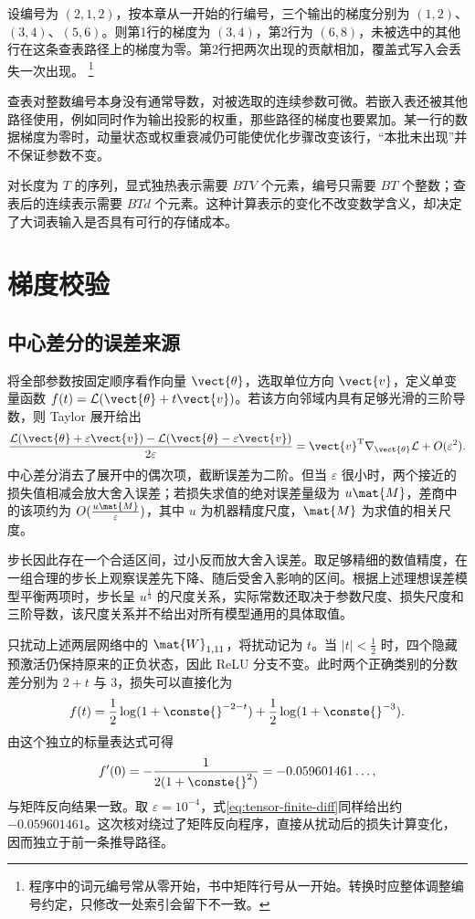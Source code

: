 \documentclass[../textbook.tex]{subfiles}
\begin{document}
设编号为 $(2,1,2)$，按本章从一开始的行编号，三个输出的梯度分别为 $(1,2)$、$(3,4)$、$(5,6)$。则第1行的梯度为 $(3,4)$，第2行为 $(6,8)$，未被选中的其他行在这条查表路径上的梯度为零。第2行把两次出现的贡献相加，覆盖式写入会丢失一次出现。
\footnote{程序中的词元编号常从零开始，书中矩阵行号从一开始。转换时应整体调整编号约定，只修改一处索引会留下不一致。}

查表对整数编号本身没有通常导数，对被选取的连续参数可微。若嵌入表还被其他路径使用，例如同时作为输出投影的权重，那些路径的梯度也要累加。某一行的数据梯度为零时，动量状态或权重衰减仍可能使优化步骤改变该行，“本批未出现”并不保证参数不变。

对长度为 $T$ 的序列，显式独热表示需要 $BTV$ 个元素，编号只需要 $BT$ 个整数；查表后的连续表示需要 $BTd$ 个元素。这种计算表示的变化不改变数学含义，却决定了大词表输入是否具有可行的存储成本。

\section{梯度校验}

\subsection{中心差分的误差来源}
将全部参数按固定顺序看作向量 $\vect{\theta}$，选取单位方向 $\vect{v}$，定义单变量函数 $f(t)=\mathcal L(\vect{\theta}+t\vect{v})$。若该方向邻域内具有足够光滑的三阶导数，则 Taylor 展开给出
\begin{equation}
 \frac{\mathcal L(\vect{\theta}+\varepsilon \vect{v})-\mathcal L(\vect{\theta}-\varepsilon \vect{v})}{2\varepsilon}
 =\vect{v}^{\mathrm{T}}\nabla_{\vect{\theta}}\mathcal L+O(\varepsilon^2).
 \label{eq:tensor-finite-diff}
\end{equation}
中心差分消去了展开中的偶次项，截断误差为二阶。但当 $\varepsilon$ 很小时，两个接近的损失值相减会放大舍入误差；若损失求值的绝对误差量级为 $u\mat{M}$，差商中的该项约为 $O(\frac{u\mat{M}}{\varepsilon})$，其中 $u$ 为机器精度尺度，$\mat{M}$ 为求值的相关尺度。

步长因此存在一个合适区间，过小反而放大舍入误差。取足够精细的数值精度，在一组合理的步长上观察误差先下降、随后受舍入影响的区间。根据上述理想误差模型平衡两项时，步长呈 $u^{\frac{1}{3}}$ 的尺度关系，实际常数还取决于参数尺度、损失尺度和三阶导数，该尺度关系并不给出对所有模型通用的具体取值。

\begin{example}
只扰动上述两层网络中的 $\mat{W}_{1,11}$，将扰动记为 $t$。当 $|t|<\frac{1}{2}$ 时，四个隐藏预激活仍保持原来的正负状态，因此 ReLU 分支不变。此时两个正确类别的分数差分别为 $2+t$ 与 $3$，损失可以直接化为
\begin{equation*}
 f(t)=\frac12\log(1+\conste{}^{-2-t})+\frac12\log(1+\conste{}^{-3}).
\end{equation*}
由这个独立的标量表达式可得
\begin{equation*}
 f'(0)=-\frac{1}{2(1+\conste{}^2)}=-0.059601461\ldots,
\end{equation*}
与矩阵反向结果一致。取 $\varepsilon=10^{-4}$，式\eqref{eq:tensor-finite-diff}同样给出约 $-0.059601461$。这次核对绕过了矩阵反向程序，直接从扰动后的损失计算变化，因而独立于前一条推导路径。
\end{example}
\end{document}

